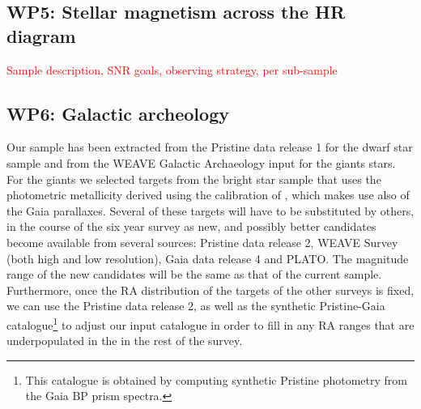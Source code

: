 \documentclass[
    traditabstract,
    longauth,
    onecolumn,
]{aa}
\begin{document}
\subsection{WP5: Stellar magnetism across the HR diagram}
\textcolor{red}{Sample description, SNR goals, observing strategy, per sub-sample}


\subsection{WP6: Galactic archeology}

Our sample has been extracted from the Pristine data release 1 
\citep{martin_pristine_2024} for the dwarf star sample and from the
WEAVE Galactic Archaeology input for the giants stars. For the giants we selected targets from the bright star sample that uses the photometric
metallicity derived using the calibration of \citet{bonifacio_pristine_2019},
which makes use also of the Gaia parallaxes.
Several of these targets will have to be substituted by others, in the course
of the six year survey as new, and possibly better candidates become available
from several sources: Pristine data release 2, WEAVE Survey (both high and low resolution), Gaia data release 4 and PLATO. The magnitude range of the new candidates will be the same as that of the current sample. Furthermore, once the RA distribution of the targets of the other surveys is fixed, we can use the Pristine data release 2, as well as the synthetic Pristine-Gaia catalogue\footnote{This catalogue is obtained by computing synthetic Pristine photometry from the Gaia BP prism spectra.} to  adjust our input catalogue in order  to fill in any  RA ranges that are underpopulated in the  in the rest of the survey.
\end{document}
